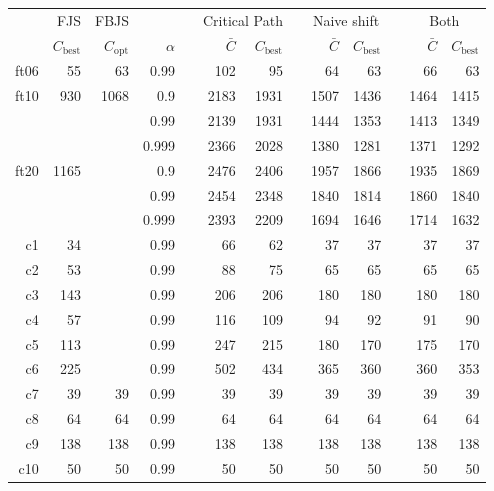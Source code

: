 \documentclass[a4paper,11pt]{article}
\begin{document}
\begin{table}
\centering
\footnotesize
\begin{tabular}{@{\bfseries}rrrrrrrrrrrrr}
	\toprule
	& FJS & FBJS & && \multicolumn{2}{c}{Critical Path} &&
	\multicolumn{2}{c}{Naive shift} && \multicolumn{2}{c}{Both} \\
	\cmidrule(lr){2-2} \cmidrule(lr){3-3} \cmidrule(lr){6-7}
	\cmidrule(lr){9-10} \cmidrule(lr){12-13}
	\normalfont{name} & $C_\text{best}$ & $C_\text{opt}$ & $\alpha$ && $\bar{C}$ & $C_\text{best}$ &&
	$\bar{C}$ & $C_\text{best}$ && $\bar{C}$ & $C_\text{best}$ \\
	\midrule
	ft06 &   55 &   63 &  0.99 &&  102 &   95 &&   64 &   63 &&   66 &   63 \\
	ft10 &  930 & 1068 &   0.9 && 2183 & 1931 && 1507 & 1436 && 1464 & 1415 \\
	     &      &      &  0.99 && 2139 & 1931 && 1444 & 1353 && 1413 & 1349 \\
	     &      &      & 0.999 && 2366 & 2028 && 1380 & 1281 && 1371 & 1292 \\
	ft20 & 1165 &      &   0.9 && 2476 & 2406 && 1957 & 1866 && 1935 & 1869 \\
	     &      &      &  0.99 && 2454 & 2348 && 1840 & 1814 && 1860 & 1840 \\
	     &      &      & 0.999 && 2393 & 2209 && 1694 & 1646 && 1714 & 1632 \\[2ex]
	c1   &   34 &      &  0.99 &&   66 &   62 &&   37 &   37 &&   37 &   37 \\
	c2   &   53 &      &  0.99 &&   88 &   75 &&   65 &   65 &&   65 &   65 \\
	c3   &  143 &      &  0.99 &&  206 &  206 &&  180 &  180 &&  180 &  180 \\
	c4   &   57 &      &  0.99 &&  116 &  109 &&   94 &   92 &&   91 &   90 \\
	c5   &  113 &      &  0.99 &&  247 &  215 &&  180 &  170 &&  175 &  170 \\
	c6   &  225 &      &  0.99 &&  502 &  434 &&  365 &  360 &&  360 &  353 \\
	c7   &   39 &   39 &  0.99 &&   39 &   39 &&   39 &   39 &&   39 &   39 \\
	c8   &   64 &   64 &  0.99 &&   64 &   64 &&   64 &   64 &&   64 &   64 \\
	c9   &  138 &  138 &  0.99 &&  138 &  138 &&  138 &  138 &&  138 &  138 \\
	c10  &   50 &   50 &  0.99 &&   50 &   50 &&   50 &   50 &&   50 &   50 \\

\end{tabular}
\end{table}
\end{document}
